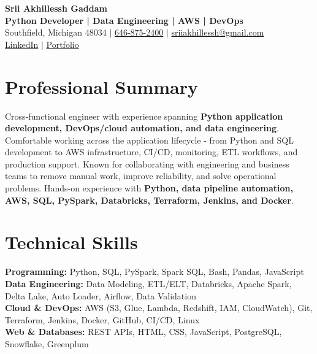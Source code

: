 \documentclass[letterpaper,10pt]{article}
\begin{document}
\fontsize{9.35pt}{10.45pt}\selectfont

\begin{center}
    {\LARGE \textbf{Srii Akhillessh Gaddam}} \\[-1pt]
    \textbf{Python Developer | Data Engineering | AWS | DevOps} \\[2pt]
    Southfield, Michigan 48034 $|$
    \href{tel:6468752400}{646-875-2400} $|$
    \href{mailto:sriiakhillessh@gmail.com}{sriiakhillessh@gmail.com} \\[1pt]
    \href{https://www.linkedin.com/in/srii-akhiilessh-gaddam-b48668191/}{LinkedIn} $|$
    \href{https://sriiakhillesshg.github.io/portfolio/}{Portfolio}
\end{center}
\vspace{-8pt}

\section{Professional Summary}
\small{Cross-functional engineer with experience spanning \textbf{Python application development, DevOps/cloud automation, and data engineering}. Comfortable working across the application lifecycle - from Python and SQL development to AWS infrastructure, CI/CD, monitoring, ETL workflows, and production support. Known for collaborating with engineering and business teams to remove manual work, improve reliability, and solve operational problems. Hands-on experience with \textbf{Python, data pipeline automation, AWS, SQL, PySpark, Databricks, Terraform, Jenkins, and Docker}.}

\section{Technical Skills}
\small{
\textbf{Programming:} Python, SQL, PySpark, Spark SQL, Bash, Pandas, JavaScript \\
\textbf{Data Engineering:} Data Modeling, ETL/ELT, Databricks, Apache Spark, Delta Lake, Auto Loader, Airflow, Data Validation \\
\textbf{Cloud \& DevOps:} AWS (S3, Glue, Lambda, Redshift, IAM, CloudWatch), Git, Terraform, Jenkins, Docker, GitHub, CI/CD, Linux \\
\textbf{Web \& Databases:} REST APIs, HTML, CSS, JavaScript, PostgreSQL, Snowflake, Greenplum
}
\end{document}
